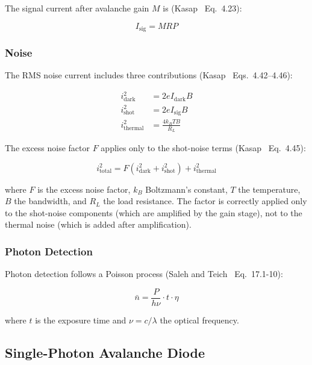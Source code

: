 \documentclass[3p,times,preprint]{elsarticle}
\begin{document}
The signal current after avalanche gain $M$ is
(Kasap~\cite{kasap} Eq.~4.23):

\begin{equation}
  I_{\text{sig}} = M R P
  \label{eq:signal-current}
\end{equation}

\subsubsection{Noise}

The RMS noise current includes three contributions
(Kasap~\cite{kasap} Eqs.~4.42--4.46):

\begin{align}
  i_{\text{dark}}^2 &= 2e I_{\text{dark}} B \\
  i_{\text{shot}}^2 &= 2e I_{\text{sig}} B \\
  i_{\text{thermal}}^2 &= \frac{4k_B T B}{R_L}
\end{align}

The excess noise factor $F$ applies only to the shot-noise terms
(Kasap~\cite{kasap} Eq.~4.45):

\begin{equation}
  i_{\text{total}}^2 = F(i_{\text{dark}}^2 + i_{\text{shot}}^2)
                      + i_{\text{thermal}}^2
  \label{eq:apd-noise}
\end{equation}

where $F$ is the excess noise factor, $k_B$ Boltzmann's constant,
$T$ the temperature, $B$ the bandwidth, and $R_L$ the load resistance.
The factor is correctly applied only to the shot-noise components
(which are amplified by the gain stage), not to the thermal noise
(which is added after amplification).

\subsubsection{Photon Detection}

Photon detection follows a Poisson process (Saleh and
Teich~\cite{saleh} Eq.~17.1-10):

\begin{equation}
  \bar{n} = \frac{P}{h\nu} \cdot t \cdot \eta
\end{equation}

where $t$ is the exposure time and $\nu = c/\lambda$ the optical frequency.

\subsection{Single-Photon Avalanche Diode}
\end{document}
